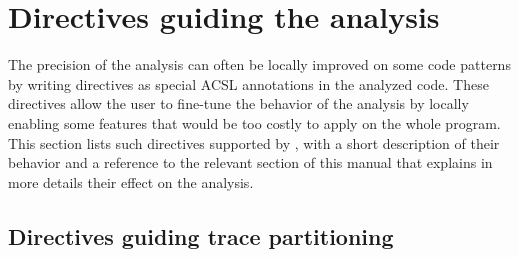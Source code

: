 \documentclass{frama-c-book}
\begin{document}
\section{Directives guiding the analysis}

The precision of the \Eva{} analysis can often be locally improved on some code
patterns by writing directives as special ACSL annotations in the analyzed code.
These directives allow the user to fine-tune the behavior of the analysis by
locally enabling some features that would be too costly to apply on the whole
program.
This section lists such directives supported by \Eva{}, with a short description
of their behavior and a reference to the relevant section of this manual that
explains in more details their effect on the analysis.


\subsection{Directives guiding trace partitioning}
\end{document}
